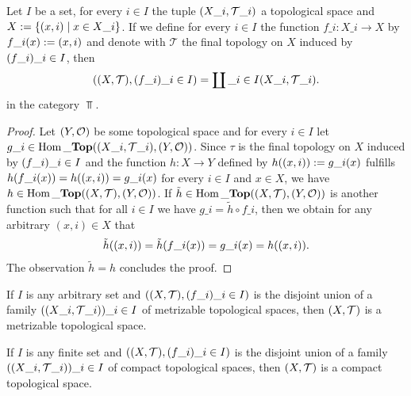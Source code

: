 \begin{lemma}
	Let $I$ be a set, for every $i \in I$ the tuple ${\left ( X\_i, \mathcal{T}\_i \right )}$ a topological space and $X := {\left \{ {\left ( x, i \right )} \mid x \in X\_i \right \}}$. If we define for every $i \in I$ the function $f\_i: X\_i \to X$ by $f\_i(x) := {\left ( x, i \right )}$ and denote with $\mathcal{T}$ the final topology on $X$ induced by ${\left ( f\_i \right )}\_{i \in I}$, then
	\begin{align*}
		\pbraces{\tspace, \pbraces{f\_i}\_{i \in I}} = \coprod\_{i \in I} \pbraces{X\_i, \mathcal{T}\_i}.
	\end{align*}
	in the category $\Top$. 
\end{lemma}
\begin{proof}
	Let $\tspace[Y][O]$ be some topological space and for every $i \in I$ let $g\_i \in \Hom\_\Top\pbraces{\pbraces{X\_i, \mathcal{T}\_i}, \tspace[Y][O]}$. Since $\tau$ is the final topology on $X$ induced by ${\left ( f\_i \right )}\_{i \in I}$ and the function $h: X \to Y$ defined by $h{\left ( (x,i) \right )} := g\_i(x)$ fulfills $h{\left ( f\_i(x) \right )} = h{\left ( (x,i) \right )} = g\_i(x)$ for every $i \in I$ and $x \in X$, we have $h \in \Hom\_\Top\pbraces{\tspace, \tspace[Y][O]}$. 
	If $\tilde{h} \in \Hom\_\Top\pbraces{\tspace, \tspace[Y][O]}$ is another function such that for all $i \in I$ we have $g\_i = \tilde{h} \circ f\_i$, then we obtain for any arbitrary $(x,i) \in X$ that
	\begin{align*}
		\tilde{h}{\left ( (x,i) \right )} = \tilde{h}{\left ( f\_i(x) \right )} = g\_i(x) = h{\left ( (x,i) \right )}.
	\end{align*}
	The observation $\tilde{h} = h$ concludes the proof.
\end{proof}

\begin{lemma}\label{lemma:disjoint\_met}
	If $I$ is any arbitrary set and $\pbraces{\tspace, \pbraces{f\_i}\_{i \in I}}$ is the disjoint union of a family $\pbraces{\indtspace}\_{i \in I}$ of metrizable topological spaces, then $\tspace$ is a metrizable topological space. 
\end{lemma}

\begin{lemma}\label{lemma:disjoint\_comp}
	If $I$ is any finite set and $\pbraces{\tspace, \pbraces{f\_i}\_{i \in I}}$ is the disjoint union of a family $\pbraces{\indtspace}\_{i \in I}$ of compact topological spaces, then $\tspace$ is a compact topological space. 
\end{lemma}
